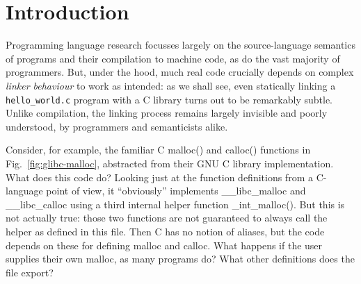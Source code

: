 \section{Introduction}

Programming language research focusses largely on the source-language
semantics of programs and their compilation to machine code, as do the
vast majority of programmers.
But, under the hood, much real code crucially depends on complex
\emph{linker behaviour} to work as intended:  as we shall see, even statically linking
a \texttt{hello\_world.c} program with a C library turns out to be
remarkably subtle.  
%
Unlike compilation, the linking process remains largely invisible and
poorly understood, by programmers and semanticists alike.

Consider, for example, the familiar C \textsf{malloc()} and \textsf{calloc()}
functions in Fig.~\ref{fig:glibc-malloc}, abstracted from their GNU C
library implementation.
What does this code do?
Looking just at the function definitions from a C-language point of view, it ``obviously'' implements 
\textsf{\_\_libc\_malloc} and \textsf{\_\_libc\_calloc} using a third
internal helper function \textsf{\_int\_malloc()}.
%
But this is not actually true: those two functions are not guaranteed
to always call the helper as defined in this file.  
%
Then C has no notion of aliases, 
but the code depends on these for defining \textsf{malloc} and \textsf{calloc}.
What happens if the user supplies their own \textsf{malloc}, as many
programs do?  What other definitions does the file export?

